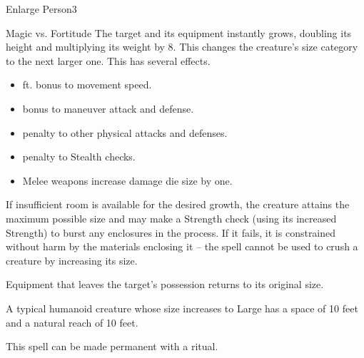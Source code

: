 \begin{spellsection}{Enlarge Person}{3}
    \begin{spellheader}
    \end{spellheader}
    \begin{spellcontent}
        \begin{spelltargetinginfo}
        \end{spelltargetinginfo}
        \begin{spelleffects}
            \begin{spellattack}{Magic vs. Fortitude}
                \spellsuccess The target and its equipment instantly grows, doubling its height and multiplying its weight by 8. This changes the creature's size category to the next larger one. This has several effects.
                \begin{itemize}
                    \item {} ft. bonus to movement speed.
                    \item {} bonus to maneuver attack and defense.
                    \item {} penalty to other physical attacks and defenses.
                    \item {} penalty to Stealth checks.
                    \item Melee weapons increase damage die size by one.
                \end{itemize}
                \par If insufficient room is available for the desired growth, the creature attains the maximum possible size and may make a Strength check (using its increased Strength) to burst any enclosures in the process. If it fails, it is constrained without harm by the materials enclosing it -- the spell cannot be used to crush a creature by increasing its size.
                \par Equipment that leaves the target's possession returns to its original size.
            \end{spellattack}
            \spelldur \durshort \dismissable
        \end{spelleffects}
    \end{spellcontent}
    \begin{spellfooter}
        \spellnotes A typical humanoid creature whose size increases to Large has a space of 10 feet and a natural reach of 10 feet. \sizingspellnotes

        This spell can be made permanent with a  ritual.
        \miscastrandom
    \end{spellfooter}
\end{spellsection}

